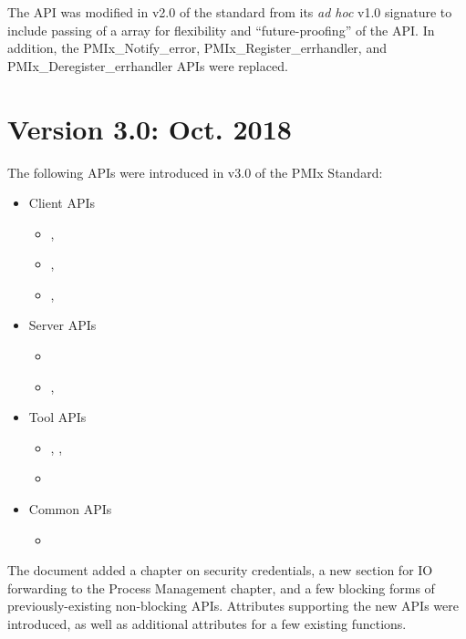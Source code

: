 The  \ac{API} was modified in v2.0 of the standard from its \textit{ad hoc} v1.0 signature to include passing of a  array for flexibility and ``future-proofing'' of the \ac{API}.
In addition, the PMIx_Notify_error, PMIx_Register_errhandler, and PMIx_Deregister_errhandler \acp{API} were replaced.


\section{Version 3.0: Oct. 2018}

The following \acp{API} were introduced in v3.0 of the PMIx Standard:

\begin{itemize}
\item Client APIs
\begin{itemize}
\item {}, 
\item {}, 
\item {}, 
\end{itemize}
\item Server APIs
\begin{itemize}
\item {}
\item {}, 
\end{itemize}
\item Tool APIs
\begin{itemize}
\item {}, , 
\item {}
\end{itemize}
\item Common APIs
\begin{itemize}
\item {}
\end{itemize}
\end{itemize}

The document added a chapter on security credentials, a new section for \ac{IO} forwarding to the Process Management chapter, and a few blocking forms of previously-existing non-blocking \acp{API}. Attributes supporting the new \acp{API} were introduced, as well as additional attributes for a few existing functions.

